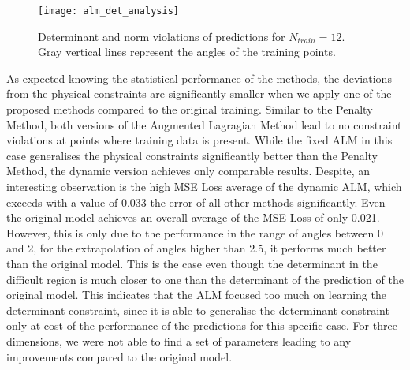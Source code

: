 \begin{figure}[]
	\texttt{[image: alm\_det\_analysis]}
	\caption{Determinant and norm violations of predictions for $N_{train} = 12$. Gray vertical lines represent the angles of the training points.}
	\label{fig:alm_det_analysis}
\end{figure}

As expected knowing the statistical performance of the methods, the deviations from the physical constraints are significantly smaller when we apply one of the proposed methods compared to the original training. Similar to the Penalty Method, both versions of the Augmented Lagragian Method lead to no constraint violations at points where training data is present. While the fixed ALM in this case generalises the physical constraints significantly better than the Penalty Method, the dynamic version achieves only comparable results. Despite, an interesting observation is the high MSE Loss average of the dynamic ALM, which exceeds with a value of 0.033 the error of all other methods significantly. Even the original model achieves an overall average of the MSE Loss of only 0.021. However, this is only due to the performance in the range of angles between 0 and 2, for the extrapolation of angles higher than 2.5, it performs much better than the original model. This is the case even though the determinant in the difficult region is much closer to one than the determinant of the prediction of the original model. This indicates that the ALM focused too much on learning the determinant constraint, since it is able to generalise the determinant constraint only at cost of the performance of the predictions for this specific case. For three dimensions, we were not able to find a set of parameters leading to any improvements compared to the original model.\\

